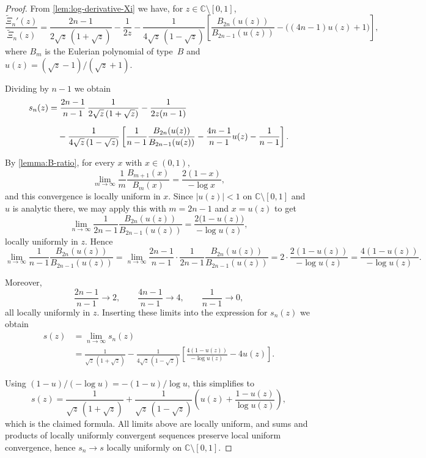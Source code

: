 \documentclass[12pt,twoside]{article}
\begin{document}
\begin{proof}
From \cref{lem:log-derivative-Xi} we have, for $z\in\mathbb{C}\setminus[0,1]$,
\[
\frac{\widetilde{\Xi}_n'(z)}{\widetilde{\Xi}_n(z)}
=
\frac{2n-1}{2\sqrt{z}\,(1+\sqrt{z})}
-\frac{1}{2z}
-\frac{1}{4\sqrt{z}\,(1-\sqrt{z})}
\left[
  \frac{B_{2n}(u(z))}{B_{2n-1}(u(z))}
  -\bigl((4n-1)u(z)+1\bigr)
\right],
\]
where $B_m$ is the Eulerian polynomial of type~$B$ and $u(z)=(\sqrt{z}-1)/(\sqrt{z}+1)$.

Dividing by $n-1$ we obtain
\[
\begin{aligned}
s_n(z)
&=
\frac{2n-1}{n-1}\,\frac{1}{2\sqrt{z}\,(1+\sqrt{z})}
-\frac{1}{2z(n-1)} \\[2mm]
&\hphantom{=} \;
-\frac{1}{4\sqrt{z}\,(1-\sqrt{z})}
\left[
  \frac{1}{n-1}\frac{B_{2n}(u(z))}{B_{2n-1}(u(z))}
  -\frac{4n-1}{n-1}u(z)
  -\frac{1}{n-1}
\right].
\end{aligned}
\]

By \cref{lemma:B-ratio}, for every $x$ with $x \in (0,1)$,
\[
\lim_{m\to\infty}\frac{1}{m}\frac{B_{m+1}(x)}{B_m(x)}
= \frac{2(1-x)}{-\log x},
\]
and this convergence is locally uniform in $x$.  
Since $|u(z)|<1$ on $\mathbb{C}\setminus[0,1]$ and $u$ is analytic there, we may apply this with $m=2n-1$ and $x=u(z)$ to get
\[
\lim_{n\to\infty}\frac{1}{2n-1}\frac{B_{2n}(u(z))}{B_{2n-1}(u(z))}
= \frac{2\bigl(1-u(z)\bigr)}{-\log u(z)},
\]
locally uniformly in $z$. Hence
\[
\lim_{n\to\infty}\frac{1}{n-1}\frac{B_{2n}(u(z))}{B_{2n-1}(u(z))}
= \lim_{n\to\infty}\frac{2n-1}{n-1}
   \cdot\frac{1}{2n-1}\frac{B_{2n}(u(z))}{B_{2n-1}(u(z))}
= 2\cdot\frac{2(1-u(z))}{-\log u(z)}
= \frac{4(1-u(z))}{-\log u(z)}.
\]

Moreover,
\[
\frac{2n-1}{n-1}\longrightarrow 2,\qquad
\frac{4n-1}{n-1}\longrightarrow 4,\qquad
\frac{1}{n-1}\longrightarrow 0,
\]
all locally uniformly in $z$. Inserting these limits into the expression for $s_n(z)$ we obtain
\[
\begin{aligned}
s(z)
&= \lim_{n\to\infty} s_n(z) \\[1mm]
&= \frac{1}{\sqrt{z}\,(1+\sqrt{z})}
-\frac{1}{4\sqrt{z}\,(1-\sqrt{z})}
\left[
  \frac{4(1-u(z))}{-\log u(z)}
  -4u(z)
\right].
\end{aligned}
\]

Using $(1-u)/(-\log u)=-(1-u)/\log u$, this simplifies to
\[
s(z)
= \frac{1}{\sqrt{z}\,(1+\sqrt{z})}
+\frac{1}{\sqrt{z}\,(1-\sqrt{z})}
\left(
  u(z)+\frac{1-u(z)}{\log u(z)}
\right),
\]
which is the claimed formula.  
All limits above are locally uniform, and sums and products of locally uniformly convergent sequences preserve local uniform convergence, hence $s_n\to s$ locally uniformly on $\mathbb{C}\setminus[0,1]$.
\end{proof}
\end{document}
